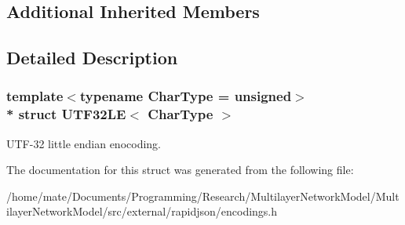 \subsection*{Additional Inherited Members}


\subsection{Detailed Description}
\subsubsection*{template$<$typename Char\+Type = unsigned$>$\\*
struct U\+T\+F32\+L\+E$<$ Char\+Type $>$}

U\+T\+F-\/32 little endian enocoding. 

The documentation for this struct was generated from the following file\+:\begin{DoxyCompactItemize}
\item 
/home/mate/\+Documents/\+Programming/\+Research/\+Multilayer\+Network\+Model/\+Multilayer\+Network\+Model/src/external/rapidjson/encodings.\+h\end{DoxyCompactItemize}
